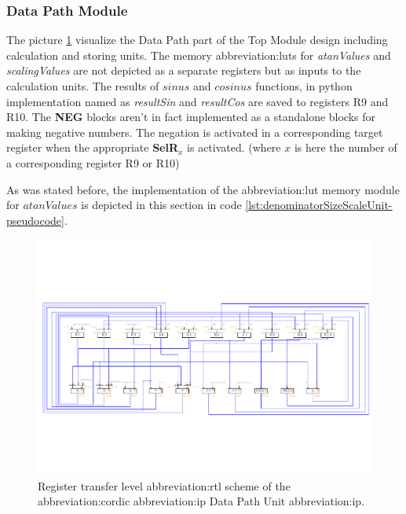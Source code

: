 \documentclass[a4paper, twoside, 11pt]{article}
\begin{document}
        \subsubsection{Data Path Module}
            The picture \ref{fig:cordic-rtl} visualize the Data Path part of the Top Module design including calculation and storing units. The memory \gls{abbreviation:lut}s for \textit{atanValues} and \textit{scalingValues} are not depicted as a separate registers but as inputs to the calculation units. The results of $sinus$ and $cosinus$ functions, in python implementation named as \textit{resultSin} and \textit{resultCos} are saved to registers R9 and R10. The \textbf{NEG} blocks aren't in fact implemented as a standalone blocks for making negative numbers. The negation is activated in a corresponding target register when the appropriate \textbf{SelR$_x$} is activated. (where $x$ is here the number of a corresponding register R9 or R10)\par
            As was stated before, the implementation of the \gls{abbreviation:lut} memory module for $atanValues$ is depicted in this section in code \ref{lst:denominatorSizeScaleUnit-pseudocode}.
            \begin{figure}[htbp!]
                \centering
                \includegraphics[width=1\textwidth]{src/pdf/cordic-rtl.pdf}
                \caption{Register transfer level \gls{abbreviation:rtl} scheme of the \gls{abbreviation:cordic} \gls{abbreviation:ip} Data Path Unit \gls{abbreviation:ip}.}
                \label{fig:cordic-rtl}
            \end{figure}
            
\end{document}
